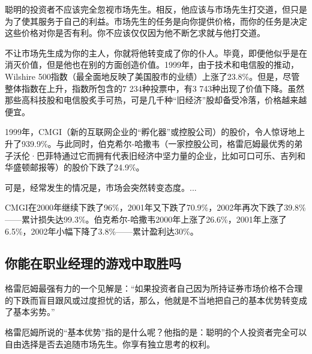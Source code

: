 \documentclass[12pt,oneside]{book}
\begin{document}
聪明的投资者不应该完全忽视市场先生。相反，他应该与市场先生打交道，但只是为了使其服务于自己的利益。市场先生的任务是向你提供价格，而你的任务是决定这些价格对你是否有利。你不应该仅仅因为他不断乞求就与他打交道。

不让市场先生成为你的主人，你就将他转变成了你的仆人。毕竟，即便他似乎是在消灭价值，但是他也在别的方面创造价值。1999年，由于技术和电信股的推动，Wilshire 500指数（最全面地反映了美国股市的业绩）上涨了23.8\%。但是，尽管整体指数在上升，指数所包含的7 234种投票中，有3 743种出现了价值下降。虽然那些高科技股和电信股炙手可热，可是几千种“旧经济”股却备受冷落，价格越来越便宜。

1999年，CMGI（新的互联网企业的“孵化器”或控股公司）的股价，令人惊讶地上升了939.9\%。与此同时，伯克希尔-哈撒韦（一家控股公司，格雷厄姆最优秀的弟子沃伦·巴菲特通过它而拥有代表旧经济中坚力量的企业，比如可口可乐、吉列和华盛顿邮报等）的股价下跌了24.9\%。

可是，经常发生的情况是，市场会突然转变态度。...

CMGI在2000年继续下跌了96\%，2001年又下跌了70.9\%，2002年再次下跌了39.8\%——累计损失达99.3\%。伯克希尔-哈撒韦2000年上涨了26.6\%，2001年上涨了6.5\%，2002年小幅下降了3.8\%——累计盈利达30\%。

\subsection{你能在职业经理的游戏中取胜吗}
格雷厄姆最强有力的一个见解是：“如果投资者自己因为所持证券市场价格不合理的下跌而盲目跟风或过度担忧的话，那么，他就是不当地把自己的基本优势转变成了基本劣势。”

格雷厄姆所说的“基本优势”指的是什么呢？他指的是：聪明的个人投资者完全可以自由选择是否去追随市场先生。你享有独立思考的权利。
\end{document}
